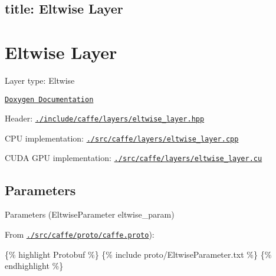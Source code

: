 

 \subsection*{title\+: Eltwise Layer }

\section*{Eltwise Layer}


\begin{DoxyItemize}
\item Layer type\+: {\ttfamily Eltwise}
\item \href{http://caffe.berkeleyvision.org/doxygen/classcaffe_1_1EltwiseLayer.html}{\tt Doxygen Documentation}
\item Header\+: \href{https://github.com/BVLC/caffe/blob/master/include/caffe/layers/eltwise_layer.hpp}{\tt {\ttfamily ./include/caffe/layers/eltwise\+\_\+layer.hpp}}
\item C\+PU implementation\+: \href{https://github.com/BVLC/caffe/blob/master/src/caffe/layers/eltwise_layer.cpp}{\tt {\ttfamily ./src/caffe/layers/eltwise\+\_\+layer.cpp}}
\item C\+U\+DA G\+PU implementation\+: \href{https://github.com/BVLC/caffe/blob/master/src/caffe/layers/eltwise_layer.cu}{\tt {\ttfamily ./src/caffe/layers/eltwise\+\_\+layer.cu}}
\end{DoxyItemize}

\subsection*{Parameters}


\begin{DoxyItemize}
\item Parameters ({\ttfamily Eltwise\+Parameter eltwise\+\_\+param})
\item From \href{https://github.com/BVLC/caffe/blob/master/src/caffe/proto/caffe.proto}{\tt {\ttfamily ./src/caffe/proto/caffe.proto}})\+:
\end{DoxyItemize}

\{\% highlight Protobuf \%\} \{\% include proto/\+Eltwise\+Parameter.\+txt \%\} \{\% endhighlight \%\} 
